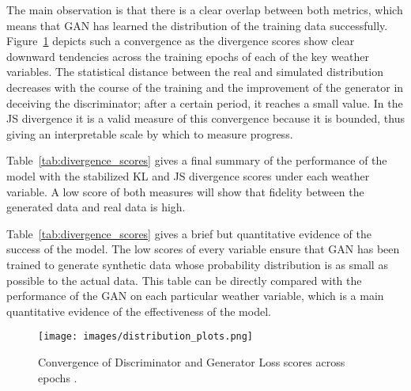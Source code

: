 \documentclass[12pt, draftclsnofoot, onecolumn]{IEEEtran}
\begin{document}
The main observation is that there is a clear overlap between both metrics, which means that GAN has learned the distribution of the training data successfully. Figure~\ref{fig:divergence_convergence}  depicts such a convergence as the divergence scores show clear downward tendencies across the training epochs of each of the key weather variables. The statistical distance between the real and simulated distribution decreases with the course of the training and the improvement of the generator in deceiving the discriminator; after a certain period, it reaches a small value. In the JS divergence it is a valid measure of this convergence because it is bounded, thus giving an interpretable scale by which to measure progress.

Table~\ref{tab:divergence_scores} gives a final summary of the performance of the model with the stabilized KL and JS divergence scores under each weather variable. A low score of both measures will show that fidelity between the generated data and real data is high.  

Table~\ref{tab:divergence_scores} gives a brief but quantitative evidence of the success of the model. The low scores of every variable ensure that GAN has been trained to generate synthetic data whose probability distribution is as small as possible to the actual data. This table can be directly compared with the performance of the GAN on each particular weather variable, which is a main quantitative evidence of the effectiveness of the model.

\begin{figure}[H]
    \centering
    \texttt{[image: images/distribution\_plots.png]}
    \caption{Convergence of Discriminator and Generator Loss scores across epochs .}
    \label{fig:divergence_convergence}
\end{figure}



\begin{table}[H]
    \centering
    \caption{Final stabilized KL and JS divergence scores for key weather variables.}
    \label{tab:divergence_scores}
\end{table}
\end{document}
